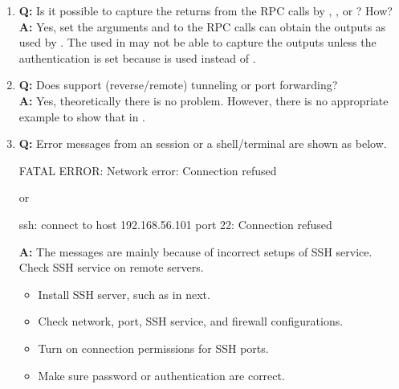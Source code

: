 \begin{enumerate}
\item {\bf\color{blue} Q:}
      Is it possible to capture the returns from the RPC calls
      by , , or ? How? \\
      {\bf\color{blue} A:}
      Yes, set the arguments  and 
      to the RPC calls can obtain the outputs as used by .
      The  used in  may not be able to capture
      the outputs unless the authentication is set because 
      is used instead of .

\item {\bf\color{blue} Q:}
      Does  support  (reverse/remote) tunneling or
      port forwarding? \\
      {\bf\color{blue} A:}
      Yes, theoretically there is no problem. However, there is no
      appropriate example to show that in .

\item {\bf\color{blue} Q:}
      Error messages from an  session or a shell/terminal
      are shown as below.
\begin{Error}
FATAL ERROR: Network error: Connection refused
\end{Error}
      or
\begin{Error}
ssh: connect to host 192.168.56.101 port 22: Connection refused
\end{Error}
      {\bf\color{blue} A:}
      The messages are mainly because of incorrect setups of SSH service.
      Check SSH service on remote servers.
      \begin{itemize}
      \item Install SSH server, such as in next.
      \item Check network, port, SSH service, and firewall configurations.
      \item Turn on connection permissions for SSH ports.
      \item Make sure password or authentication are correct.
      \end{itemize} 

\end{enumerate}

